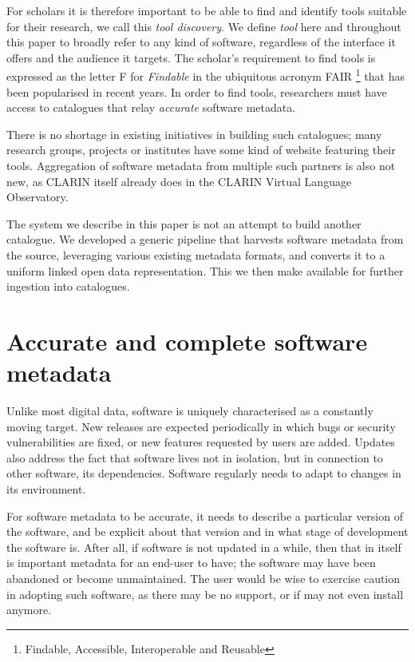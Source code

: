 \documentclass[a4paper,11pt]{article}
\begin{document}
For scholars it is therefore important to be able to find and identify
tools suitable for their research, we call this \emph{tool discovery}. We
define \emph{tool} here and throughout this paper to broadly refer to any kind
of software, regardless of the interface it offers and the audience it targets.
The scholar's requirement to find tools is expressed as the letter \textsc{F}
for \emph{Findable} in the ubiquitous acronym \textsc{FAIR} \footnote{Findable,
Accessible, Interoperable and Reusable} that has been popularised in recent
years. In order to find tools, researchers must have access to catalogues that
relay \emph{accurate} software metadata.

There is no shortage in existing initiatives in building such catalogues; many
research groups, projects or institutes have some kind of website featuring
their tools. Aggregation of software metadata from multiple such partners is
also not new, as CLARIN itself already does in the CLARIN Virtual Language
Observatory.

The system we describe in this paper is not an attempt to build another catalogue.
We developed a generic pipeline that harvests software metadata from the source, leveraging
various existing metadata formats, and converts it to a uniform linked open data representation.
This we then make available for further ingestion into catalogues. 

\section{Accurate and complete software metadata}

Unlike most digital data, software is uniquely characterised as a constantly
moving target. New releases are expected periodically in which bugs or security
vulnerabilities are fixed, or new features requested by users are added.
Updates also address the fact that software lives not in isolation, but in
connection to other software, its dependencies. Software regularly needs to
adapt to changes in its environment.

For software metadata to be accurate, it needs to describe a
particular version of the software, and be explicit about that version and in
what stage of development the software is. After all, if software is not
updated in a while, then that in itself is important metadata for an end-user
to have; the software may have been abandoned or become unmaintained. The user
would be wise to exercise caution in adopting such software, as there may be no
support, or if may not even install anymore.
\end{document}
